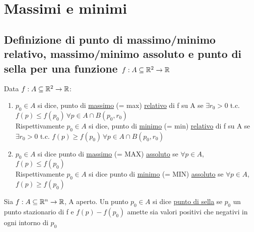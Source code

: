 \section{Massimi e minimi}
\subsection{Definizione di punto di massimo/minimo relativo, massimo/minimo
assoluto e punto di sella per una funzione $f: A \subseteq \mathbb{R}^2 \to \mathbb{R}$}
\begin{definition}
  Data $f: A \subseteq \mathbb{R}^2 \to \mathbb{R}$: 
  \begin{enumerate}
    \item $p_0 \in A$ si dice, punto di \underline{massimo} (= max) \underline{relativo} di f su A se 
          $\exists r_0 > 0$ t.c. $f(p) \leq f(p_0) \, \forall p \in A \cap B(p_0,r_0)$ \\
          Rispettivamente $p_0 \in A$ si dice, punto di \underline{minimo} (= min) \underline{relativo} di f su A se 
          $\exists r_0 > 0$ t.c. $f(p) \geq f(p_0) \, \forall p \in A \cap B(p_0,r_0)$
    \item $p_0 \in A$ si dice punto di \underline{massimo} (= MAX) \underline{assoluto} se 
          $\forall p \in A$, $f(p) \leq f(p_0)$ \\
          Rispettivamente $p_0 \in A$ si dice punto di \underline{minimo} (= MIN) \underline{assoluto} se 
          $\forall p \in A$, $f(p) \geq f(p_0)$ 
  \end{enumerate}
\end{definition}
\begin{definition}
  Sia $f: A \subseteq \mathbb{R}^n \to \mathbb{R}$, A aperto. Un punto $p_0 \in A$ si dice \underline{punto di sella} se $p_0$ \ace un punto 
  stazionario di f e $f(p)-f(p_0)$ amette sia valori positivi che negativi in ogni intorno di $p_0$
\end{definition}